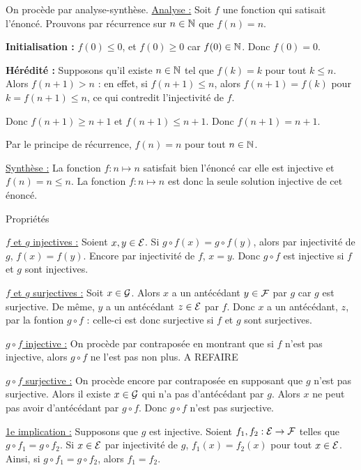\documentclass[]{../templates/homework}
\begin{document}
\subproblem
On procède par analyse-synthèse.
\underline{Analyse :} Soit $f$ une fonction qui satisait l'énoncé. Prouvons par récurrence sur $n\in\mathbb N$ que $f(n) = n$.

\textbf{Initialisation :} $f(0) \leq 0$, et $f(0) \geq 0$ car $f(0) \in \mathbb N$. Donc $f(0) = 0$.

\textbf{Hérédité :} Supposons qu'il existe $n\in\mathbb N$ tel que $f(k) = k$ pour tout $k \leq n$. Alors $f(n+1) > n$ : en effet, si $f(n+1) \leq n$, alors $f(n+1) = f(k)$ pour $k = f(n+1) \leq n$, ce qui contredit l'injectivité de $f$.

Donc $f(n+1) \geq n+1$ et $f(n+1) \leq n+1$. Donc $f(n+1) = n+1$.

Par le principe de récurrence, $f(n) = n$ pour tout $n\in\mathbb N$.

\underline{Synthèse :} La fonction $f:n\mapsto n$ satisfait bien l'énoncé car elle est injective et $f(n) = n \leq n$. La fonction $f:n \mapsto n$ est donc la seule solution injective de cet énoncé.


 {Propriétés}
\setcounter{subproblem}{0}
\subproblem
\question

\underline{$f$ et $g$ injectives :} Soient $x,y\in\mathcal E$. Si $g\circ f(x) = g\circ f(y)$, alors par injectivité de $g$, $f(x) = f(y)$. Encore par injectivité de $f$, $x = y$. Donc $g\circ f$ est injective si $f$ et $g$ sont injectives.

\underline{$f$ et $g$ surjectives :} Soit $x \in \mathcal G$. Alors $x$ a un antécédant $y\in\mathcal F$ par $g$ car $g$ est surjective. De même, $y$ a un antécédant $z\in\mathcal E$ par $f$. Donc $x$ a un antécédant, $z$, par la fontion $g\circ f$ : celle-ci est donc surjective si $f$ et $g$ sont surjectives.

\question

\underline{$g\circ f$ injective :} On procède par contraposée en montrant que si $f$ n'est pas injective, alors $g\circ f$ ne l'est pas non plus. A REFAIRE

\underline{$g\circ f$ surjective :} On procède encore par contraposée en supposant que $g$ n'est pas surjective. Alors il existe $x\in\mathcal G$ qui n'a pas d'antécédant par $g$. Alors $x$ ne peut pas avoir d'antécédant par $g\circ f$. Donc $g\circ f$ n'est pas surjective.

\subproblem

\question
\underline{1e implication :} Supposons que $g$ est injective. Soient $f_{1},f_{2}:\mathcal E\rightarrow\mathcal F$ telles que $g\circ f_{1} = g\circ f_{2}$. Si $x\in\mathcal E$ par injectivité de $g$, $f_{1}(x) = f_{2}(x)$ pour tout $x\in\mathcal E$. Ainsi, si $g\circ f_{1} = g\circ f_{2}$, alors $f_{1} = f_{2}$.
\end{document}
